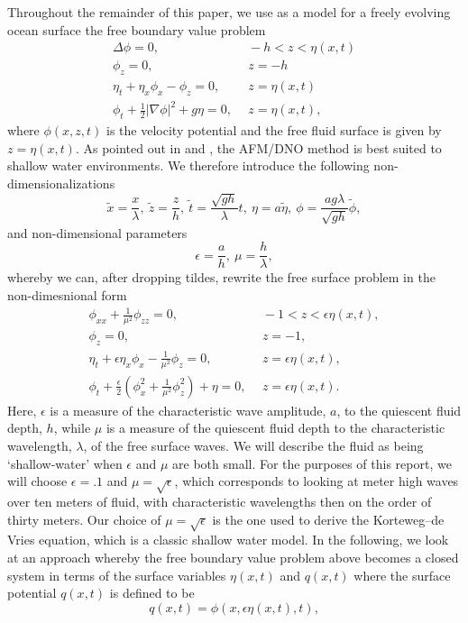Throughout the remainder of this paper, we use as a model for a freely evolving ocean surface the free boundary value problem 
\begin{align*}
\Delta \phi = 0, & ~~ -h < z < \eta(x,t) \\ 
\phi_{z} = 0, & ~~ z=-h\\
\eta_{t} + \eta_{x}\phi_{x}-\phi_{z} = 0, & ~~ z = \eta(x,t) \\ 
\phi_{t} + \frac{1}{2}\left|\nabla \phi \right|^{2} + g\eta = 0, & ~~ z=\eta(x,t),
\end{align*}
where $\phi(x,z,t)$ is the velocity potential and the free fluid surface is given by $z=\eta(x,t)$.  As pointed out in \cite{yue} and \cite{wilkening}, the AFM/DNO method is best suited to shallow water environments.  We therefore introduce the following non-dimensionalizations
\[
\tilde{x} = \frac{x}{\lambda}, ~ \tilde{z} = \frac{z}{h}, ~ \tilde{t} = \frac{\sqrt{gh}}{\lambda} t , ~ \eta = a \tilde{\eta}, ~ \phi = \frac{ag\lambda}{\sqrt{gh}}\tilde{\phi}, 
\]
and non-dimensional parameters
\[
\epsilon = \frac{a}{h}, ~ \mu = \frac{h}{\lambda}, 
\]
whereby we can, after dropping tildes, rewrite the free surface problem in the non-dimesnional form
\begin{align*}
\phi_{xx} + \frac{1}{\mu^{2} }\phi_{zz} = 0, & ~~ -1 < z < \epsilon\eta(x,t), \\ 
\phi_{z} = 0, & ~~ z=-1,\\
\eta_{t} + \epsilon\eta_{x}\phi_{x}-\frac{1}{\mu^{2}}\phi_{z} = 0, & ~~ z = \epsilon\eta(x,t), \\ 
\phi_{t} + \frac{\epsilon}{2}\left(\phi_{x}^{2} + \frac{1}{\mu^{2}}\phi_{z}^{2}\right) + \eta = 0, & ~~ z=\epsilon\eta(x,t).
\end{align*}
Here, $\epsilon$ is a measure of the characteristic wave amplitude, $a$, to the quiescent fluid depth, $h$, while $\mu$ is a measure of the quiescent fluid depth to the characteristic wavelength, $\lambda$, of the free surface waves.  We will describe the fluid as being `shallow-water' when $\epsilon$ and $\mu$ are both small.  For the purposes of this report, we will choose $\epsilon = .1$ and $\mu = \sqrt{\epsilon}$, which corresponds to looking at meter high waves over ten meters of fluid, with characteristic wavelengths then on the order of thirty meters.  Our choice of $\mu=\sqrt{\epsilon}$ is the one used to derive the Korteweg--de Vries equation, which is a classic shallow water model.  In the following, we look at an approach whereby the free boundary value problem above becomes a closed system in terms of the surface variables $\eta(x,t)$ and $q(x,t)$ where the surface potential $q(x,t)$ is defined to be 
\[
q(x,t) = \phi(x,\epsilon\eta(x,t),t),
\]
